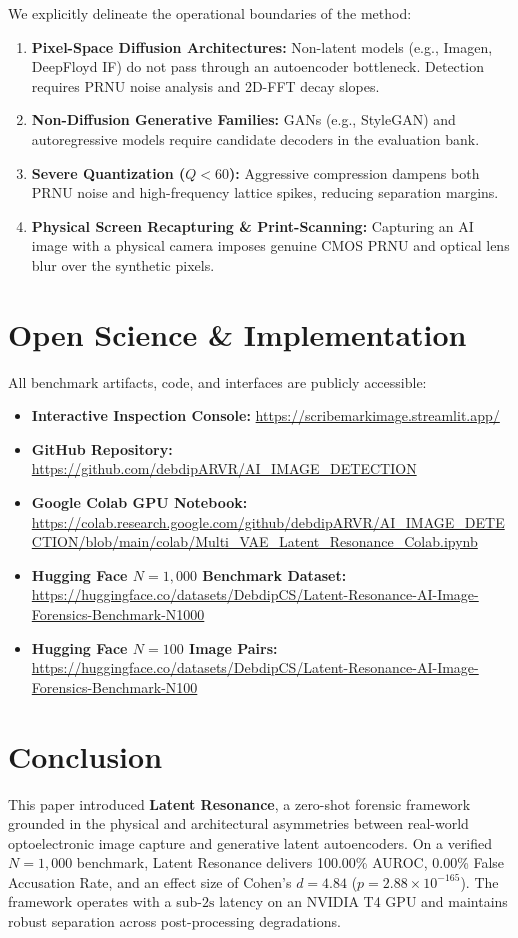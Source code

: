 \documentclass[conference]{IEEEtran}
\begin{document}
We explicitly delineate the operational boundaries of the method:
\begin{enumerate}
    \item \textbf{Pixel-Space Diffusion Architectures:} Non-latent models (e.g., Imagen, DeepFloyd IF) do not pass through an autoencoder bottleneck. Detection requires PRNU noise analysis and 2D-FFT decay slopes.
    \item \textbf{Non-Diffusion Generative Families:} GANs (e.g., StyleGAN) and autoregressive models require candidate decoders in the evaluation bank.
    \item \textbf{Severe Quantization ($Q < 60$):} Aggressive compression dampens both PRNU noise and high-frequency lattice spikes, reducing separation margins.
    \item \textbf{Physical Screen Recapturing \& Print-Scanning:} Capturing an AI image with a physical camera imposes genuine CMOS PRNU and optical lens blur over the synthetic pixels.
\end{enumerate}

\section{Open Science \& Implementation}
\label{sec:reproducibility}

All benchmark artifacts, code, and interfaces are publicly accessible:
\begin{itemize}
    \item \textbf{Interactive Inspection Console:} \url{https://scribemarkimage.streamlit.app/}
    \item \textbf{GitHub Repository:} \url{https://github.com/debdipARVR/AI_IMAGE_DETECTION}
    \item \textbf{Google Colab GPU Notebook:} \url{https://colab.research.google.com/github/debdipARVR/AI_IMAGE_DETECTION/blob/main/colab/Multi_VAE_Latent_Resonance_Colab.ipynb}
    \item \textbf{Hugging Face $N=1,000$ Benchmark Dataset:} \url{https://huggingface.co/datasets/DebdipCS/Latent-Resonance-AI-Image-Forensics-Benchmark-N1000}
    \item \textbf{Hugging Face $N=100$ Image Pairs:} \url{https://huggingface.co/datasets/DebdipCS/Latent-Resonance-AI-Image-Forensics-Benchmark-N100}
\end{itemize}

\section{Conclusion}
\label{sec:conclusion}

This paper introduced \textbf{Latent Resonance}, a zero-shot forensic framework grounded in the physical and architectural asymmetries between real-world optoelectronic image capture and generative latent autoencoders. On a verified $N=1,000$ benchmark, Latent Resonance delivers 100.00\% AUROC, 0.00\% False Accusation Rate, and an effect size of Cohen's $d = 4.84$ ($p = 2.88 \times 10^{-165}$). The framework operates with a sub-$2\text{s}$ latency on an NVIDIA T4 GPU and maintains robust separation across post-processing degradations.



\end{document}
